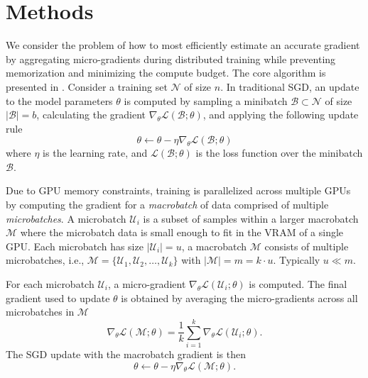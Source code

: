 \section{Methods}
\label{sec:methods}

We consider the problem of how to most efficiently estimate an accurate gradient by aggregating micro-gradients during distributed training while preventing memorization and minimizing the compute budget. The core algorithm is presented in . Consider a training set $\mathcal{N}$ of size $n$. In traditional SGD, an update to the model parameters $\theta$ is computed by sampling a minibatch $\mathcal{B} \subset \mathcal{N}$ of size $|\mathcal{B}| = b$, calculating the gradient $\nabla_\theta \mathcal{L}(\mathcal{B}; \theta)$, and applying the following update rule
\begin{equation} \label{eq:sgd_update}
    \theta \leftarrow \theta - \eta \nabla_\theta \mathcal{L}(\mathcal{B}; \theta)
\end{equation}
where $\eta$ is the learning rate, and $\mathcal{L}(\mathcal{B}; \theta)$ is the loss function over the minibatch $\mathcal{B}$.

Due to GPU memory constraints, training is parallelized across multiple GPUs by computing the gradient for a \textit{macrobatch} of data comprised of multiple \textit{microbatches}. A microbatch $\mathcal{U}_i$ is a subset of samples within a larger macrobatch $\mathcal{M}$ where the microbatch data is small enough to fit in the VRAM of a single GPU. Each microbatch has size $|\mathcal{U}_i| = u$, a macrobatch $\mathcal{M}$ consists of multiple microbatches, i.e., $\mathcal{M} = \{\mathcal{U}_1, \mathcal{U}_2, \dots, \mathcal{U}_k\}$ with $|\mathcal{M}| = m = k \cdot u$. Typically $u \ll m$.

For each microbatch $\mathcal{U}_i$, a micro-gradient $\nabla_\theta \mathcal{L}(\mathcal{U}_i; \theta)$ is computed. The final gradient used to update $\theta$ is obtained by averaging the micro-gradients across all microbatches in $\mathcal{M}$
\begin{equation} \label{eq:macro_batch_eq_without_GAF}
    \nabla_\theta \mathcal{L}(\mathcal{M}; \theta) = \frac{1}{k} \sum_{i=1}^k \nabla_\theta \mathcal{L}(\mathcal{U}_i; \theta).
\end{equation}
The SGD update with the macrobatch gradient is then
\begin{equation} \label{eq:sgd_macrobatch_update}
    \theta \leftarrow \theta - \eta \nabla_\theta \mathcal{L}(\mathcal{M}; \theta).
\end{equation}

